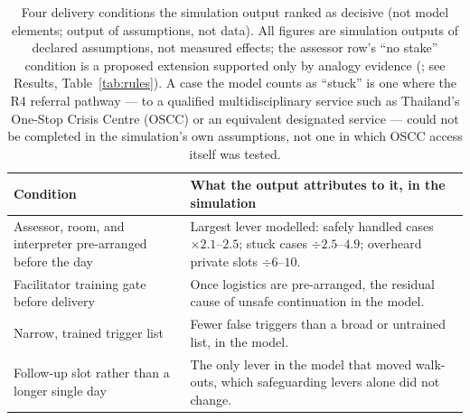 \begin{table}[H]
\centering\footnotesize\raggedright
\caption{Four delivery conditions the simulation output ranked as decisive (not model elements;
output of assumptions, not data). All figures are simulation outputs of declared assumptions, not
measured effects; the assessor row's ``no stake'' condition is a proposed extension supported only by
analogy evidence (\protect\cite{ref158,ref159,ref162,ref163}; see Results, Table~\protect\ref{tab:rules}).
A case the model counts as ``stuck'' is one where the R4 referral pathway --- to a qualified
multidisciplinary service such as Thailand's One-Stop Crisis Centre (OSCC) or an equivalent
designated service --- could not be completed in the simulation's own assumptions, not one in which
OSCC access itself was tested.}
\label{tab:delivery}
\begin{tabularx}{\columnwidth}{@{}p{2.4cm}Y@{}}
\toprule
\textbf{Condition} & \textbf{What the output attributes to it, in the simulation}\\
\midrule
Assessor, room, and interpreter pre-arranged before the day & Largest lever modelled: safely handled
cases $\times2.1$--$2.5$; stuck cases $\div2.5$--$4.9$; overheard private slots $\div6$--$10$.\\
Facilitator training gate before delivery & Once logistics are pre-arranged, the residual cause of
unsafe continuation in the model.\\
Narrow, trained trigger list & Fewer false triggers than a broad or untrained list, in the model.\\
Follow-up slot rather than a longer single day & The only lever in the model that moved walk-outs,
which safeguarding levers alone did not change.\\
\bottomrule
\end{tabularx}
\end{table}

